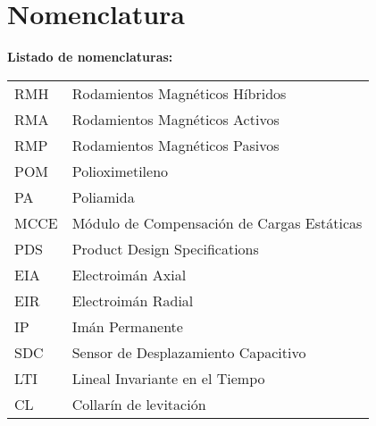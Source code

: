 \chapter{Nomenclatura}

\textbf{Listado de nomenclaturas:}\\


\begin{tabular}{ll}
	RMH\hspace{3cm} & Rodamientos Magn\'eticos H\'ibridos\\
	RMA\hspace{3cm} & Rodamientos Magn\'eticos Activos\\
	RMP\hspace{3cm} & Rodamientos Magn\'eticos Pasivos\\
	POM\hspace{3cm} & Polioximetileno \\
	PA\hspace{3cm} & Poliamida\\
	MCCE\hspace{3cm} & M\'odulo de Compensaci\'on de Cargas Est\'aticas\\
	PDS\hspace{3cm} & Product Design Specifications\\ 
	EIA\hspace{3cm} & Electroim\'an Axial\\
	EIR\hspace{3cm} & Electroim\'an Radial\\
	IP\hspace{3cm} & Im\'an Permanente\\
	SDC\hspace{3cm} & Sensor de Desplazamiento Capacitivo\\
	LTI\hspace{3cm} & Lineal Invariante en el Tiempo\\
	CL\hspace{3cm} & Collar\'in de levitaci\'on
\end{tabular}

